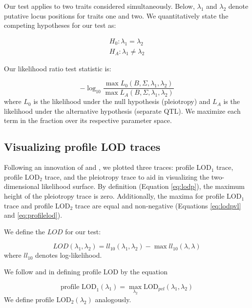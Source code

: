 \documentclass[12pt,twoside, lineno]{gsajnl}
\begin{document}
Our test applies to two traits considered simultaneously. Below,
$\lambda_1$ and $\lambda_2$ denote putative locus positions for traits
one and two. We quantitatively state the competing hypotheses for our
test as:

\begin{eqnarray}
H_0: \lambda_1 = \lambda_2 \nonumber\\
H_A: \lambda_1 \neq \lambda_2
\label{eqn:hypotheses}
\end{eqnarray}

\noindent Our likelihood ratio test statistic is:

\begin{equation}
- \log_{10} \frac{\max L_0(B, \Sigma, \lambda_1, \lambda_2)}{\max L_A(B, \Sigma, \lambda_1, \lambda_2)}
\label{eqn:test-statistic}
\end{equation}
where $L_0$ is the likelihood under the null hypothesis (pleiotropy)
and $L_A$ is the likelihood under the alternative hypothesis (separate
QTL). We maximize each term in the fraction over its respective
parameter space.

\subsection{Visualizing profile LOD traces}

Following an innovation of \citet{zeng2000genetic} and
\citet{tian2016dissection}, we plotted three traces: profile LOD$_1$
trace, profile LOD$_2$ trace, and the pleiotropy trace to aid in
visualizing the two-dimensional likelihood surface. By definition
(Equation \ref{eq:lodp}), the maximum height of the pleiotropy trace
is zero. Additionally, the maxima for profile LOD$_1$ trace and
profile LOD$_2$ trace are equal and non-negative (Equations
\ref{eq:lodpvl} and \ref{eq:profilelod}).

We define the $LOD$ for our test:

\begin{equation}
LOD(\lambda_1, \lambda_2) = ll_{10}(\lambda_1, \lambda_2) - \max ll_{10}(\lambda, \lambda)
\label{eq:lodpvl}
\end{equation}
where $ll_{10}$ denotes log-likelihood.

We follow \citet{zeng2000genetic} and \citet{tian2016dissection} in
defining profile LOD by the equation

\begin{equation}
\text{profile LOD}_1(\lambda_1) = \max_{\lambda_2}\text{LOD}_{pvl}(\lambda_1, \lambda_2)
\label{eq:profilelod}
\end{equation}
We define profile LOD$_2(\lambda_2)$ analogously.
\end{document}
